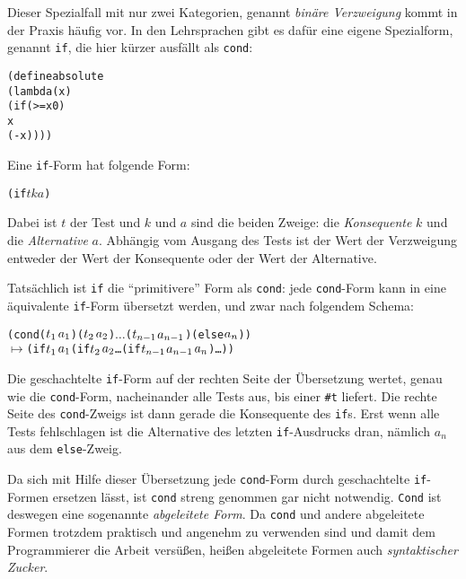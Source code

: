 %
Dieser Spezialfall mit nur zwei Kategorien, genannt \textit{binäre
  Verzweigung} kommt in der Praxis
häufig vor.  In den Lehrsprachen gibt es dafür eine eigene Spezialform,
genannt \texttt{if}, die hier kürzer ausfällt
als \texttt{cond}:
%
\begin{alltt}
(define absolute
  (lambda (x)
    (if (>= x 0)
        x
        (- x))))
\end{alltt}
%
Eine \texttt{if}-Form hat folgende Form:
%
\begin{alltt}
(if \(t\) \(k\) \(a\))
\end{alltt}
Dabei ist $t$ der Test und $k$ und $a$ sind die
beiden Zweige: die \textit{Konsequente} $k$ und die
\textit{Alternative} $a$.  Abhängig vom Ausgang des
Tests ist der Wert der Verzweigung entweder der Wert der Konsequente
oder der Wert der Alternative.

Tatsächlich ist \texttt{if} die "`primitivere"' Form als
\texttt{cond}: jede \texttt{cond}-Form kann in eine äquivalente
\texttt{if}-Form übersetzt werden, und zwar nach
folgendem Schema:
%
\begin{alltt}
(cond (\(t\sb{1}\) \(a\sb{1}\)) (\(t\sb{2}\) \(a\sb{2}\)) \(\ldots\) (\(t\sb{n-1}\) \(a\sb{n-1}\)) (else \(a\sb{n}\)))
  \(\mapsto\) (if \(t\sb{1}\) \(a\sb{1}\) (if \(t\sb{2}\) \(a\sb{2}\) \ldots (if \(t\sb{n-1}\) \(a\sb{n-1}\) \(a\sb{n}\))\ldots))
\end{alltt}
%
Die geschachtelte \texttt{if}-Form auf der rechten Seite der
Übersetzung wertet, genau wie die \texttt{cond}-Form, nacheinander
alle Tests aus, bis einer \verb|#t| liefert.  Die rechte Seite des
\texttt{cond}-Zweigs ist dann gerade die Konsequente des \texttt{if}s.
Erst wenn alle Tests fehlschlagen ist die Alternative des letzten
\texttt{if}-Ausdrucks dran, nämlich $a_n$ aus dem \texttt{else}-Zweig.

Da sich mit Hilfe dieser Übersetzung jede \texttt{cond}-Form durch
geschachtelte \texttt{if}-Formen ersetzen lässt, ist \texttt{cond}
streng genommen gar nicht notwendig.  \texttt{Cond} ist deswegen eine
sogenannte \textit{abgeleitete Form}.  Da \texttt{cond} und andere
abgeleitete Formen trotzdem praktisch und angenehm zu verwenden sind
und damit dem Programmierer die Arbeit versüßen,
heißen abgeleitete Formen auch \textit{syntaktischer
  Zucker}.

